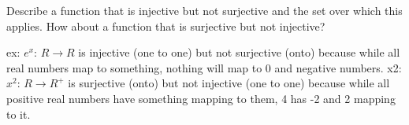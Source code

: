 \question Describe a function that is injective but not surjective 
and the set over which this applies. How about a function that is 
surjective but not injective?

\begin{solution}
ex: $e^x$: $R \rightarrow R$ is injective (one to one) but not 
surjective (onto) because while all real numbers map to something, 
nothing will map to 0 and negative numbers.
x2: $x^2$: $R \rightarrow R^+$ is surjective (onto) but not injective 
(one to one) because while all positive real numbers have something 
mapping to them, 4 has -2 and 2 mapping to it.
\end{solution}

\clearpage